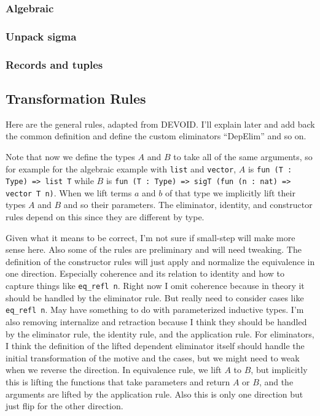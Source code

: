 \subsubsection{Algebraic}

\subsubsection{Unpack sigma}

\subsubsection{Records and tuples}

\subsection{Transformation Rules}

Here are the general rules, adapted from DEVOID.
I'll explain later and add back the common definition and define the custom eliminators ``DepElim'' and so on.

Note that now we define the types $A$ and $B$ to take all of the same arguments, so for example for the algebraic
example with \lstinline{list} and \lstinline{vector}, $A$ is \lstinline{fun (T : Type) => list T} while $B$
is \lstinline{fun (T : Type) => sigT (fun (n : nat) => vector T n)}. When we lift terms $a$ and $b$ of that type
we implicitly lift their types $A$ and $B$ and so their parameters. The eliminator, identity, and constructor rules
depend on this since they are different by type.

Given what it means to be correct, I'm not sure if small-step will make more sense here.
Also some of the rules are preliminary and will need tweaking.
The definition of the constructor rules will just apply and normalize the equivalence in one direction.
Especially coherence and its relation to identity and how to capture things like \lstinline{eq_refl n}.
Right now I omit coherence because in theory it should be handled by the eliminator rule.
But really need to consider cases like \lstinline{eq_refl n}.
May have something to do with parameterized inductive types.
I'm also removing internalize and retraction because I think they should be handled
by the eliminator rule, the identity rule, and the application rule.
For eliminators, I think the definition of the lifted dependent eliminator itself should handle the initial transformation
of the motive and the cases, but we might need to weak when we reverse the direction.
In equivalence rule, we lift $A$ to $B$, but implicitly this is lifting the functions that take parameters and return $A$ or $B$,
and the arguments are lifted by the application rule.
Also this is only one direction but just flip for the other direction.


